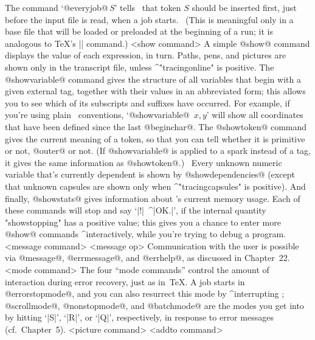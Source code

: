 The command `@everyjob@$\,S$' tells \MF\ that token $S$ should be inserted
first, just before the input file is read, when a job starts. \ (This
is meaningful only in a base file that will be loaded or preloaded
at the beginning of a run; it is analogous to \TeX's |\everyjob| command.)
\beginsyntax
<show command>
 \alt[showdependencies]
 \alt[showstats]
\endsyntax
A simple @show@ command displays the value of each expression, in turn.
Paths, pens, and pictures are shown only in the transcript file, unless
^"tracingonline" is positive. The @showvariable@ command gives the
structure of all variables that begin with a given external tag,
together with their values in an abbreviated form; this allows you to see
which of its subscripts and suffixes have occurred. For example, if you're
using plain \MF\ conventions, `@showvariable@~$x,y$' will show all
coordinates that have been defined since the last @beginchar@. The @showtoken@
command gives the current meaning of a token, so that you can tell whether
it is primitive or not, @outer@ or not. (If @showvariable@ is applied to
a spark instead of a tag, it gives the same information as @showtoken@.)
\ Every unknown numeric variable that's currently dependent is shown by
@showdependencies@ (except that unknown capsules are shown only
when ^"tracingcapsules" is positive). And finally, @showstats@ gives
information about \MF's current memory usage.
Each of these commands will stop and say `|!|~^|OK.|', if the internal
quantity "showstopping" has a positive value; this gives you a chance
to enter more @show@ commands ^{interactive}ly, while you're trying to
debug a program.
\beginsyntax
<message command>
<message op>\is[message]\alt[errmessage]\alt[errhelp]
\endsyntax
Communication with the user is possible via @message@, @errmessage@,
and @errhelp@, as discussed in Chapter~22.
\beginsyntax
<mode command>\is[batchmode]\alt[nonstopmode]
 \alt[scrollmode]\alt[errorstopmode]
\endsyntax
The four ``mode commands'' control the amount of interaction during error
recovery, just as in~\TeX. A job starts in @errorstopmode@, and you can
also resurrect this mode by ^{interrupting} \MF; @scrollmode@,
@nonstopmode@, and @batchmode@ are the modes you get into by hitting
`|S|', `|R|', or `|Q|', respectively, in response to error messages
(cf.~Chapter~5).
\beginsyntax
<picture command>
<addto command>
